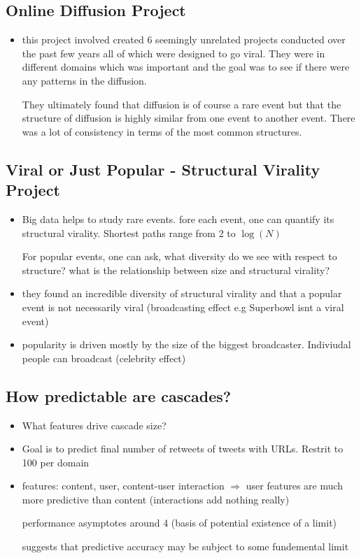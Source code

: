 \subsection{Online Diffusion Project}
\begin{itemize}
\item this project involved created 6 seemingly unrelated projects conducted over the past few years all of which were designed to go viral.  They were in different domains which was important and the goal was to see if there were any patterns in the diffusion.  

They ultimately found that diffusion is of course a rare event but that the structure of diffusion is highly similar from one event to another event.  There was a lot of consistency in terms of the most common structures.  
\end{itemize}

\subsection{Viral or Just Popular - Structural Virality Project}
\begin{itemize}
\item Big data helps to study rare events.  fore each event, one can quantify its structural virality.   Shortest paths range from 2 to $\log(N)$

For popular events, one can ask, what diversity do we see with respect to structure? 
what is the relationship between size and structural virality? 

\item they found an incredible diversity of structural virality and that a popular event is not necessarily viral (broadcasting effect e.g Superbowl isnt a viral event)
\item popularity is driven mostly by the size of the biggest broadcaster.  Indiviudal people can broadcast (celebrity effect)
\end{itemize}


\subsection{How predictable are cascades?}
\begin{itemize}
\item What features drive cascade size?  
\item Goal is to predict final number of retweets of tweets with URLs.  Restrit to 100 per domain

\item features: content, user, content-user interaction $\Rightarrow$ user features are much more predictive than content (interactions add nothing really)

performance asymptotes around 4 (basis of potential existence of a limit)

suggests that predictive accuracy may be subject to some fundemental limit

\end{itemize}
 

